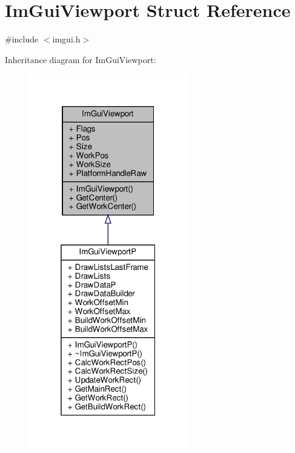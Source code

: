 \hypertarget{structImGuiViewport}{}\section{Im\+Gui\+Viewport Struct Reference}
\label{structImGuiViewport}


{\ttfamily \#include $<$imgui.\+h$>$}



Inheritance diagram for Im\+Gui\+Viewport\+:
\nopagebreak
\begin{figure}[H]
\begin{center}
\leavevmode
\includegraphics[width=196pt]{structImGuiViewport__inherit__graph}
\end{center}
\end{figure}


